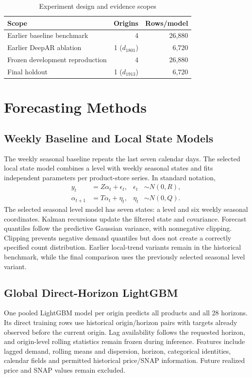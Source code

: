 \documentclass[conference]{IEEEtran}
\begin{document}
\begin{table}[t]\caption{Experiment design and evidence scopes}\label{tab:scopes}\centering\footnotesize\begin{tabular}{lrr}\toprule
Scope & Origins & Rows/model\\\midrule
Earlier baseline benchmark & 4 & 26,880\\
Earlier DeepAR ablation & 1 ($d_{1801}$) & 6,720\\
Frozen development reproduction & 4 & 26,880\\
Final holdout & 1 ($d_{1913}$) & 6,720\\\bottomrule\end{tabular}\end{table}
\section{Forecasting Methods}
\subsection{Weekly Baseline and Local State Models}
The weekly seasonal baseline repeats the last seven calendar days. The selected local state model combines a level with weekly seasonal states and fits independent parameters per product-store series. In standard notation,
\begin{align}
y_t &= Z\alpha_t+\epsilon_t, & \epsilon_t&\sim N(0,R),\\
\alpha_{t+1}&=T\alpha_t+\eta_t, & \eta_t&\sim N(0,Q).
\end{align}
The selected seasonal level model has seven states: a level and six weekly seasonal coordinates. Kalman recursions update the filtered state and covariance. Forecast quantiles follow the predictive Gaussian variance, with nonnegative clipping. Clipping prevents negative demand quantiles but does not create a correctly specified count distribution. Earlier local-trend variants remain in the historical benchmark, while the final comparison uses the previously selected seasonal level variant.

\subsection{Global Direct-Horizon LightGBM}
One pooled LightGBM model per origin predicts all products and all 28 horizons. Its direct training rows use historical origin/horizon pairs with targets already observed before the current origin. Lag availability follows the requested horizon, and origin-level rolling statistics remain frozen during inference. Features include lagged demand, rolling means and dispersion, horizon, categorical identities, calendar fields and permitted historical price/SNAP information. Future realized price and SNAP values remain excluded.
\end{document}

